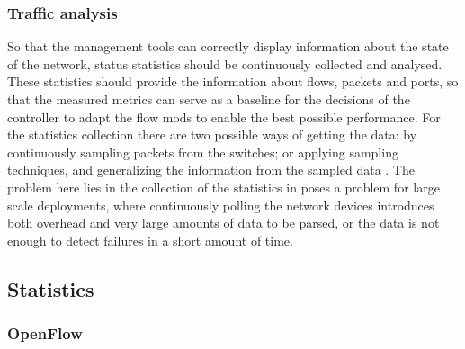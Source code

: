 \subsubsection {Traffic analysis}

So that the management tools can correctly display information about the state of the network, status statistics should be continuously collected and analysed. These statistics should provide the information about flows, packets
and ports, so that the measured metrics can serve as a baseline for the decisions of the controller to adapt the flow mods to enable the best possible performance. For the statistics collection there are two possible ways of 
getting the data: by continuously sampling packets from the switches; or applying sampling techniques, and generalizing the information from the sampled data \cite{CITE - low_overhead_te_elephants_detec}. The problem here lies
in the collection of the statistics in poses a problem for large scale deployments, where continuously polling the network devices introduces both overhead and very large amounts of data to be parsed, or the data is not enough
to detect failures in a short amount of time.

\subsection {Statistics}

\subsubsection {OpenFlow}

